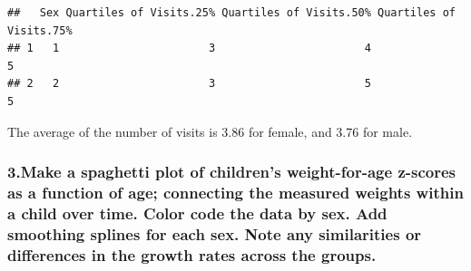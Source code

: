 \documentclass[
]{article}
\begin{document}
\begin{verbatim}
##   Sex Quartiles of Visits.25% Quartiles of Visits.50% Quartiles of Visits.75%
## 1   1                       3                       4                       5
## 2   2                       3                       5                       5
\end{verbatim}

The average of the number of visits is 3.86 for female, and 3.76 for
male.

\hypertarget{make-a-spaghetti-plot-of-childrens-weight-for-age-z-scores-as-a-function-of-age-connecting-the-measured-weights-within-a-child-over-time.-color-code-the-data-by-sex.-add-smoothing-splines-for-each-sex.-note-any-similarities-or-differences-in-the-growth-rates-across-the-groups.}{%
\subsubsection{3.Make a spaghetti plot of children's weight-for-age
z-scores as a function of age; connecting the measured weights within a
child over time. Color code the data by sex. Add smoothing splines for
each sex. Note any similarities or differences in the growth rates
across the
groups.}\label{make-a-spaghetti-plot-of-childrens-weight-for-age-z-scores-as-a-function-of-age-connecting-the-measured-weights-within-a-child-over-time.-color-code-the-data-by-sex.-add-smoothing-splines-for-each-sex.-note-any-similarities-or-differences-in-the-growth-rates-across-the-groups.}}
\end{document}

